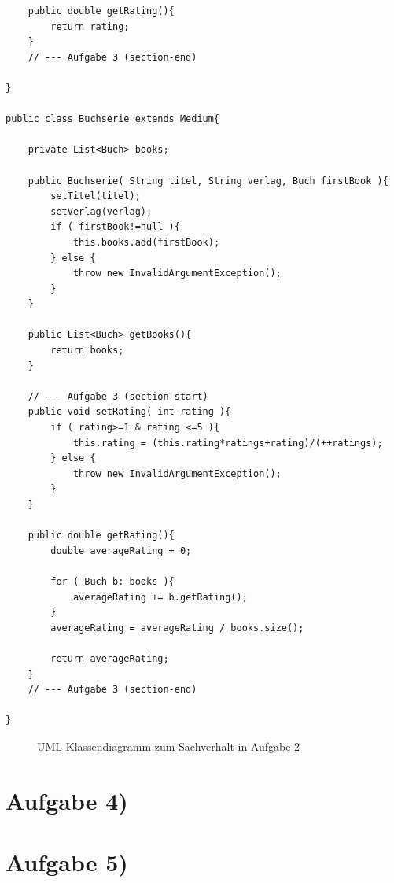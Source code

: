 \documentclass{swp1}
\begin{document}
\begin{lstlisting}
	public double getRating(){
		return rating;
	}
	// --- Aufgabe 3 (section-end)
	
}

public class Buchserie extends Medium{
	
	private List<Buch> books;
	
	public Buchserie( String titel, String verlag, Buch firstBook ){
		setTitel(titel);
		setVerlag(verlag);
		if ( firstBook!=null ){
			this.books.add(firstBook);
		} else {
			throw new InvalidArgumentException();
		}
	}
	
	public List<Buch> getBooks(){
		return books;
	}
	
	// --- Aufgabe 3 (section-start)
	public void setRating( int rating ){
		if ( rating>=1 & rating <=5 ){
			this.rating = (this.rating*ratings+rating)/(++ratings);
		} else {
			throw new InvalidArgumentException();
		}
	}
	
	public double getRating(){
		double averageRating = 0;
		
		for ( Buch b: books ){
			averageRating += b.getRating();
		}
		averageRating = averageRating / books.size();
		
		return averageRating;
	}
	// --- Aufgabe 3 (section-end)
	
}
\end{lstlisting}

\begin{figure}[h]
\caption{UML Klassendiagramm zum Sachverhalt in Aufgabe 2}
\label{ab3}
\end{figure}

\section*{Aufgabe 4)}
\section*{Aufgabe 5)}
\end{document}
